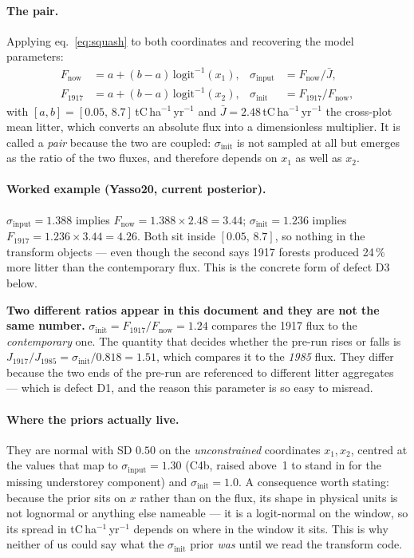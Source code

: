 \documentclass[11pt]{article}
\newcommand{\sinit}{\sigma_{\mathrm{init}}}
\newcommand{\sinput}{\sigma_{\mathrm{input}}}
\begin{document}
\paragraph{The pair.} Applying eq.~\eqref{eq:squash} to both coordinates and recovering the
model parameters:
\begin{align}
F_{\mathrm{now}}  &= a + (b-a)\,\mathrm{logit}^{-1}(x_1), &
\sinput &= F_{\mathrm{now}}/\bar{J}, \label{eq:fp1}\\
F_{1917} &= a + (b-a)\,\mathrm{logit}^{-1}(x_2), &
\sinit  &= F_{1917}/F_{\mathrm{now}}, \label{eq:fp2}
\end{align}
with $[a,b] = [0.05,\,8.7]$\,tC\,ha$^{-1}$\,yr$^{-1}$ and $\bar{J} = 2.48$\,tC\,ha$^{-1}$\,yr$^{-1}$
the cross-plot mean litter, which converts an absolute flux into a dimensionless multiplier. It
is called a \emph{pair} because the two are coupled: $\sinit$ is not sampled at all but emerges
as the ratio of the two fluxes, and therefore depends on $x_1$ as well as $x_2$.

\paragraph{Worked example (Yasso20, current posterior).} $\sinput = 1.388$ implies
$F_{\mathrm{now}} = 1.388 \times 2.48 = 3.44$; $\sinit = 1.236$ implies
$F_{1917} = 1.236 \times 3.44 = 4.26$. Both sit inside $[0.05,\,8.7]$, so nothing in the
transform objects --- even though the second says 1917 forests produced 24\,\% more litter than
the contemporary flux. This is the concrete form of defect D3 below.

\begin{caveat}
\textbf{Two different ratios appear in this document and they are not the same number.}
$\sinit = F_{1917}/F_{\mathrm{now}} = 1.24$ compares the 1917 flux to the \emph{contemporary}
one. The quantity that decides whether the pre-run rises or falls is
$J_{1917}/J_{1985} = \sinit/0.818 = 1.51$, which compares it to the \emph{1985} flux. They differ
because the two ends of the pre-run are referenced to different litter aggregates --- which is
defect D1, and the reason this parameter is so easy to misread.
\end{caveat}

\paragraph{Where the priors actually live.} They are normal with SD $0.50$ on the
\emph{unconstrained} coordinates $x_1, x_2$, centred at the values that map to $\sinput = 1.30$
(C4b, raised above~1 to stand in for the missing understorey component) and $\sinit = 1.0$. A
consequence worth stating: because the prior sits on $x$ rather than on the flux, its shape in
physical units is not lognormal or anything else nameable --- it is a logit-normal on the window,
so its spread in tC\,ha$^{-1}$\,yr$^{-1}$ depends on where in the window it sits. This is why
neither of us could say what the $\sinit$ prior \emph{was} until we read the transform code.
\end{document}
